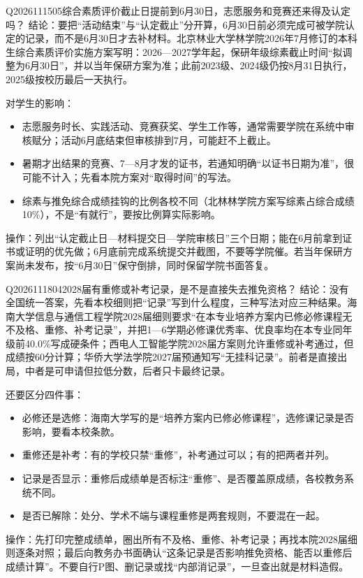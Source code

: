 \begin{qa}{Q2026111505}{综合素质评价截止日提前到6月30日，志愿服务和竞赛还来得及认定吗？}
结论：要把“活动结束”与“认定截止”分开算，6月30日前必须完成可被学院认定的记录，而不是6月30日才去补材料。北京林业大学林学院2026年7月修订的本科生综合素质评价实施方案写明：2026—2027学年起，保研年级综素截止时间“拟调整为6月30日”，并以当年保研方案为准；此前2023级、2024级仍按8月31日执行，2025级按校历最后一天执行。

对学生的影响：

\begin{itemize}
\item 志愿服务时长、实践活动、竞赛获奖、学生工作等，通常需要学院在系统中审核赋分；活动6月底结束但审核排到7月，可能赶不上截止。
\item 暑期才出结果的竞赛、7—8月才发的证书，若通知明确“以证书日期为准”，很可能不计入；先看本院方案对“取得时间”的写法。
\item 综素与推免综合成绩挂钩的比例各校不同（北林林学院方案写综素占综合成绩10\%），不是“有就行”，要按比例算实际影响。
\end{itemize}

操作：列出“认定截止日—材料提交日—学院审核日”三个日期；能在6月前拿到证书或证明的优先做；6月底前完成系统提交并截图，不要等学院催。若当年保研方案尚未发布，按“6月30日”保守倒排，同时保留学院书面答复。
\end{qa}
\begin{qa}{Q2026111804}{2028届有重修或补考记录，是不是直接失去推免资格？}
结论：没有全国统一答案，先看本校细则把“记录”写到什么程度，三种写法对应三种结果。海南大学信息与通信工程学院2028届细则要求“在本专业培养方案内已修必修课程无不及格、重修、补考记录”，并把1—6学期必修课优秀率、优良率均在本专业同年级前40.0\%写成硬条件；西电人工智能学院2028届方案则允许重修或补考通过，但成绩按60分计算；华侨大学法学院2027届预通知写“无挂科记录”。前者是直接出局，中者是可申请但拉低分数，后者只卡最终记录。

还要区分四件事：

\begin{itemize}
\item 必修还是选修：海南大学写的是“培养方案内已修必修课程”，选修课记录是否影响，要看本校条款。
\item 重修还是补考：有的学校只禁“重修”，补考通过可以；有的把两者并列。
\item 记录是否显示：重修后成绩单是否标注“重修”、是否覆盖原成绩，各校教务系统不同。
\item 是否已解除：处分、学术不端与课程重修是两套规则，不要混在一起。
\end{itemize}

操作：先打印完整成绩单，圈出所有不及格、重修、补考记录；再找本院2028届细则逐条对照；最后向教务办书面确认“这条记录是否影响推免资格、能否以重修后成绩计算”。不要自行P图、删记录或找“内部消记录”，一旦查出就是材料造假。
\end{qa}
